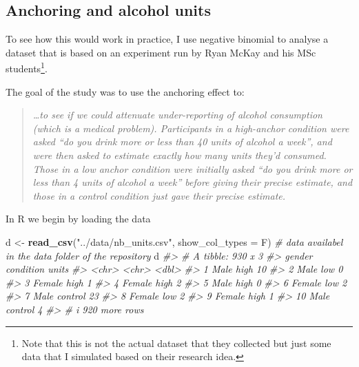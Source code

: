 \documentclass[
]{book}
\newenvironment{Shaded}{\begin{snugshade}}{\end{snugshade}}
\newcommand{\AttributeTok}[1]{\textcolor[rgb]{0.13,0.29,0.53}{#1}}
\newcommand{\CommentTok}[1]{\textcolor[rgb]{0.56,0.35,0.01}{\textit{#1}}}
\newcommand{\FunctionTok}[1]{\textcolor[rgb]{0.13,0.29,0.53}{\textbf{#1}}}
\newcommand{\NormalTok}[1]{#1}
\newcommand{\OtherTok}[1]{\textcolor[rgb]{0.56,0.35,0.01}{#1}}
\newcommand{\StringTok}[1]{\textcolor[rgb]{0.31,0.60,0.02}{#1}}
\begin{document}
\subsection{Anchoring and alcohol units}\label{anchoring-and-alcohol-units}

To see how this would work in practice, I use negative binomial to analyse a dataset that is based on an experiment run by Ryan McKay and his MSc students\footnote{Note that this is not the actual dataset that they collected but just some data that I simulated based on their research idea.}.

The goal of the study was to use the anchoring effect to:

\begin{quote}
\emph{\ldots to see if we could attenuate under-reporting of alcohol consumption (which is a medical problem). Participants in a high-anchor condition were asked ``do you drink more or less than 40 units of alcohol a week'', and were then asked to estimate exactly how many units they'd consumed. Those in a low anchor condition were initially asked ``do you drink more or less than 4 units of alcohol a week'' before giving their precise estimate, and those in a control condition just gave their precise estimate.}
\end{quote}

In R we begin by loading the data

\begin{Shaded}
\begin{Highlighting}[]
\NormalTok{d }\OtherTok{\textless{}{-}} \FunctionTok{read\_csv}\NormalTok{(}\StringTok{"../data/nb\_units.csv"}\NormalTok{, }\AttributeTok{show\_col\_types =}\NormalTok{ F) }\CommentTok{\# data availabel in the data folder of the repository}
\NormalTok{d}
\CommentTok{\#\textgreater{} \# A tibble: 930 x 3}
\CommentTok{\#\textgreater{}    gender condition units}
\CommentTok{\#\textgreater{}    \textless{}chr\textgreater{}  \textless{}chr\textgreater{}     \textless{}dbl\textgreater{}}
\CommentTok{\#\textgreater{}  1 Male   high         10}
\CommentTok{\#\textgreater{}  2 Male   low           0}
\CommentTok{\#\textgreater{}  3 Female high          1}
\CommentTok{\#\textgreater{}  4 Female high          2}
\CommentTok{\#\textgreater{}  5 Male   high          0}
\CommentTok{\#\textgreater{}  6 Female low           2}
\CommentTok{\#\textgreater{}  7 Male   control      23}
\CommentTok{\#\textgreater{}  8 Female low           2}
\CommentTok{\#\textgreater{}  9 Female high          1}
\CommentTok{\#\textgreater{} 10 Male   control       4}
\CommentTok{\#\textgreater{} \# i 920 more rows}
\end{Highlighting}
\end{Shaded}
\end{document}
